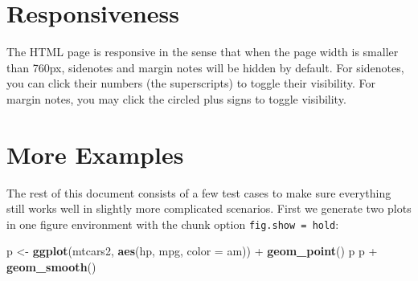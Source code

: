 \documentclass[]{tufte-handout}
\newenvironment{Shaded}{}{}
\newcommand{\DataTypeTok}[1]{\textcolor[rgb]{0.56,0.13,0.00}{#1}}
\newcommand{\KeywordTok}[1]{\textcolor[rgb]{0.00,0.44,0.13}{\textbf{#1}}}
\newcommand{\NormalTok}[1]{#1}
\newcommand{\OperatorTok}[1]{\textcolor[rgb]{0.40,0.40,0.40}{#1}}
\newcommand{\StringTok}[1]{\textcolor[rgb]{0.25,0.44,0.63}{#1}}
\begin{document}
\hypertarget{responsiveness}{%
\section{Responsiveness}\label{responsiveness}}

The HTML page is responsive in the sense that when the page width is
smaller than 760px, sidenotes and margin notes will be hidden by
default. For sidenotes, you can click their numbers (the superscripts)
to toggle their visibility. For margin notes, you may click the circled
plus signs to toggle visibility.

\hypertarget{more-examples}{%
\section{More Examples}\label{more-examples}}

The rest of this document consists of a few test cases to make sure
everything still works well in slightly more complicated scenarios.
First we generate two plots in one figure environment with the chunk
option \texttt{fig.show\ =\ \textquotesingle{}hold\textquotesingle{}}:

\begin{Shaded}
\begin{Highlighting}[]
\NormalTok{p <-}\StringTok{ }\KeywordTok{ggplot}\NormalTok{(mtcars2, }\KeywordTok{aes}\NormalTok{(hp, mpg, }\DataTypeTok{color =}\NormalTok{ am)) }\OperatorTok{+}
\StringTok{  }\KeywordTok{geom_point}\NormalTok{()}
\NormalTok{p}
\NormalTok{p }\OperatorTok{+}\StringTok{ }\KeywordTok{geom_smooth}\NormalTok{()}
\end{Highlighting}
\end{Shaded}
\end{document}
